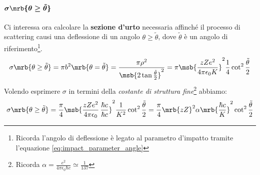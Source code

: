 \paragraph{$\boldsymbol{\sigma\mrb{\theta\ge\tilde\theta}}$}
Ci interessa ora calcolare la \textbf{sezione d'urto} necessaria affinché il
processo di scattering causi una deflessione di un angolo
$\theta\ge\tilde\theta$, dove $\tilde\theta$ è un angolo di
riferimento\footnote{
	Ricorda l'angolo di deflessione è legato al parametro d'impatto tramite
	l'equazione \ref{eq:impact_parameter_angle}
}.
\begin{equation}
	\sigma\mrb{\theta\ge\tilde\theta} = \pi b^2\mrb{\theta=\tilde\theta}
	= \frac{\pi\rho^2}{\msb{2\tan{\frac{\tilde\theta}{2}}}^2} =
	\pi\msb{\frac{zZe^2}{4\pi\epsilon_0K}}^2
	\frac{1}{4}\cot^2{\frac{\tilde\theta}{2}}
\end{equation}
Volendo esprimere $\sigma$ in termini della \textit{costante di struttura
	fine}\footnote{
	Ricorda $\alpha= \frac{e^2}{4\pi\epsilon_0 \hbar c} \simeq \frac{1}{137}$
} abbiamo:
\begin{equation}
	\sigma\mrb{\theta\ge\tilde\theta} =
	\frac{\pi}{4}\msb{\frac{zZe^2}{4\pi\epsilon_0} \, \frac{\hbar c}{\hbar
			c}}^2 \frac{1}{K^2}\cot^2{\frac{\tilde\theta}{2}} = \frac{\pi}{4}
	\mrb{zZ}^2\alpha\mrb{\frac{\hbar c}{K}}^2\cot^2{\frac{\tilde\theta}{2}}
\end{equation}

